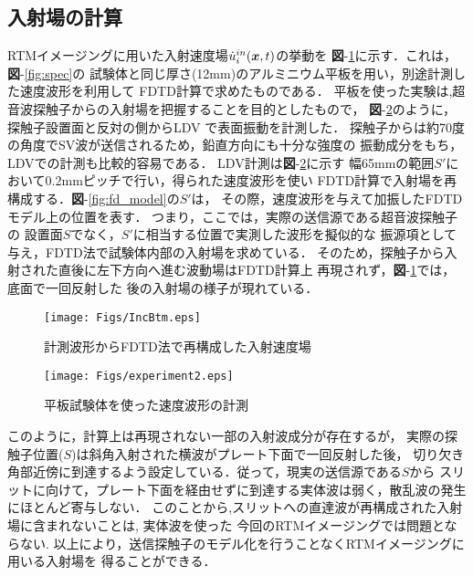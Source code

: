 \subsection{入射場の計算}
RTMイメージングに用いた入射速度場$\dot{u}_i^{in}(\boldsymbol{x},t)$の挙動を
{\bf 図}-\ref{fig:inc_btm}に示す．これは，{\bf 図}-\ref{fig:spec}の
試験体と同じ厚さ(12mm)のアルミニウム平板を用い，別途計測した速度波形を利用して
FDTD計算で求めたものである．
平板を使った実験は,超音波探触子からの入射場を把握することを目的としたもので，
{\bf 図}-\ref{fig:experiment2}のように，探触子設置面と反対の側からLDV
で表面振動を計測した．
%
探触子からは約70度の角度でSV波が送信されるため，鉛直方向にも十分な強度の
振動成分をもち，LDVでの計測も比較的容易である．
%
LDV計測は{\bf 図}-\ref{fig:experiment2}に示す
幅65mmの範囲$S'$において0.2mmピッチで行い，得られた速度波形を使い
FDTD計算で入射場を再構成する．{\bf 図}-\ref{fig:fd_model}の$S'$は，
その際，速度波形を与えて加振したFDTDモデル上の位置を表す．
つまり，ここでは，実際の送信源である超音波探触子の
設置面$S$でなく，$S'$に相当する位置で実測した波形を擬似的な
振源項として与え，FDTD法で試験体内部の入射場を求めている．
そのため，探触子から入射された直後に左下方向へ進む波動場はFDTD計算上
再現されず，{\bf 図}-\ref{fig:inc_btm}では，底面で一回反射した
後の入射場の様子が現れている．
\begin{figure}[thb]
\centering
	\texttt{[image: Figs/IncBtm.eps]}
	\caption{計測波形からFDTD法で再構成した入射速度場}
	\label{fig:inc_btm}
\end{figure}
\begin{figure}[hbt]
\centering
	\texttt{[image: Figs/experiment2.eps]}
	\caption{平板試験体を使った速度波形の計測}
	\label{fig:experiment2}
\end{figure}
このように，計算上は再現されない一部の入射波成分が存在するが，
実際の探触子位置($S$)は斜角入射された横波がプレート下面で一回反射した後，
切り欠き角部近傍に到達するよう設定している．従って，現実の送信源である$S$から
スリットに向けて，プレート下面を経由せずに到達する実体波は弱く，散乱波の発生にほとんど寄与しない．
このことから,スリットへの直達波が再構成された入射場に含まれないことは,
%
実体波を使った
%
今回のRTMイメージングでは問題とならない.
以上により，送信探触子のモデル化を行うことなくRTMイメージングに用いる入射場を
得ることができる．
